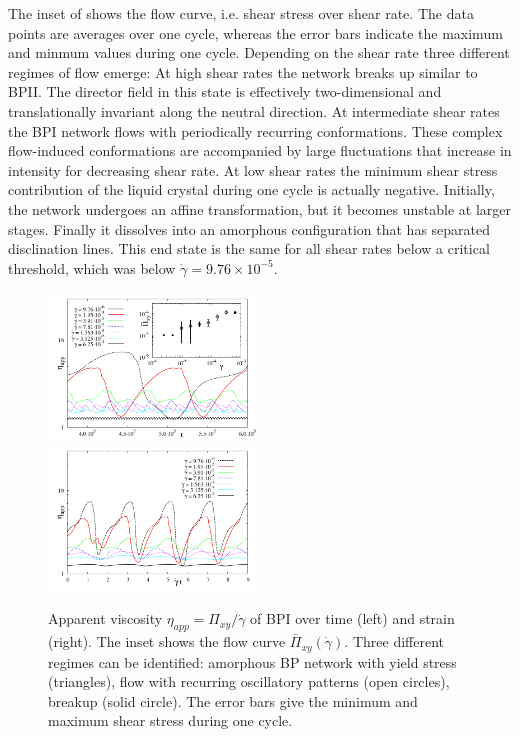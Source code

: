 \documentclass[aps,pre,reprint,superscriptaddress, twocolumn]{revtex4}
\newcommand{\e}[1]{\times10^{#1}}
\newcommand{\gd}{\dot{\gamma}}
\begin{document}
The inset of shows the flow curve, i.e. shear stress over shear rate.
The data points are averages over one cycle, whereas the error bars indicate the maximum and
minmum values during one cycle. Depending on the shear rate three different regimes of flow emerge:
At high shear rates the network breaks up similar to BPII. The director field in this state
is effectively two-dimensional and translationally invariant along the neutral direction.
At intermediate shear rates the BPI network flows with periodically recurring conformations.
These complex flow-induced conformations are accompanied by large fluctuations that increase 
in intensity for decreasing shear rate. At low shear rates the minimum shear stress contribution
of the liquid crystal during one cycle is actually negative. 
Initially, the network undergoes an affine transformation, but it becomes unstable at larger stages. 
Finally it dissolves into an amorphous configuration that has separated disclination lines. This 
end state is the same for all shear rates below a critical threshold, which was below $\gd=9.76\e{-5}$. 

\begin{figure}[htpb]
\includegraphics[width=0.495\textwidth]{stress_bp1.pdf}
\includegraphics[width=0.495\textwidth]{stress_vs_strain_bp1.pdf}
\caption{Apparent viscosity $\eta_{app}=\Pi_{xy}/\dot{\gamma}$ of BPI over time (left) and strain (right). The inset shows the flow curve $\bar{\Pi}_{xy}(\gd)$. Three different regimes can be identified: amorphous BP network with yield stress (triangles), flow with recurring oscillatory patterns (open circles), breakup (solid circle). The error bars give the minimum and maximum shear stress during one cycle.}
\label{bp1-rheo}
\end{figure}
\end{document}
